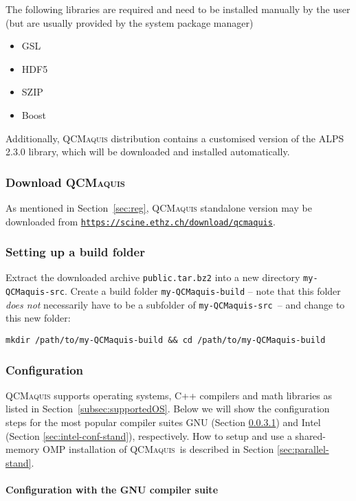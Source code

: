 \documentclass[bibliography=totoc,12pt,a4paper]{scrartcl}
\newcommand{\qcm}{\textsc{QCMaquis}}
\newcommand{\qcmsrc}{\texttt{my-QCMaquis-src}}
\newcommand{\qcmbuild}{\texttt{my-QCMaquis-build}}
\begin{document}
The following libraries are required and need to be installed manually by the user (but are usually provided by the system package manager)
\begin{itemize}
 \item GSL
 \item HDF5
 \item SZIP
 \item Boost
\end{itemize}
Additionally, \qcm{} distribution contains a customised version of the ALPS 2.3.0 library, which will be downloaded and installed automatically.

\subsubsection{Download \qcm}\label{subsubsec:download-stand}

As mentioned in Section~\ref{sec:reg}, \qcm{} standalone version may be downloaded from \texttt{\url{https://scine.ethz.ch/download/qcmaquis}}.

\subsubsection{Setting up a build folder}

Extract the downloaded archive \texttt{public.tar.bz2} into a new directory \texttt{\qcmsrc}.
\noindent Create a build folder \texttt{\qcmbuild} -- note that this folder \emph{does not} necessarily have to be a subfolder
of \qcmsrc\ -- and change to this new folder:
\begin{verbatim}
mkdir /path/to/my-QCMaquis-build && cd /path/to/my-QCMaquis-build
\end{verbatim}

\subsubsection{Configuration}\label{subsubsec:configure-stand}

\qcm{} supports operating systems, C++ compilers and math libraries as listed in Section~\ref{subsec:supportedOS}. Below we will show the configuration steps for
the most popular compiler suites GNU (Section \ref{sec:gnu-conf-stand}) and Intel (Section \ref{sec:intel-conf-stand}), respectively.
How to setup and use a shared-memory OMP installation of \qcm\ is described in Section \ref{sec:parallel-stand}.

\paragraph{Configuration with the GNU compiler suite}\label{sec:gnu-conf-stand}$\;$\\
\end{document}

